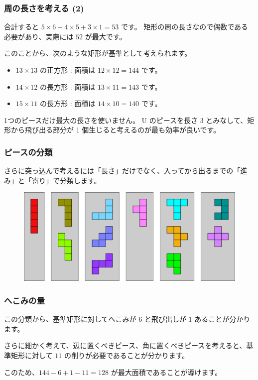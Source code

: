 \documentclass{beamer}
\begin{document}
\begin{frame}
    \frametitle{周の長さを考える (2)}

    合計すると \(5 \times 6 + 4 \times 5 + 3 \times 1 = 53\) です。
    矩形の周の長さなので偶数である必要があり、実際には \(52\) が最大です。

    \bigskip

    このことから、次のような矩形が基準として考えられます。

    \begin{itemize}
        \item \(13 \times 13\) の正方形 : 面積は \(12 \times 12 = 144\) です。
        \item \(14 \times 12\) の長方形 : 面積は \(13 \times 11 = 143\) です。
        \item \(15 \times 11\) の長方形 : 面積は \(14 \times 10 = 140\) です。
    \end{itemize}

    \bigskip

    1つのピースだけ最大の長さを使いません。
    U のピースを長さ 3 とみなして、矩形から飛び出る部分が 1 個生じると考えるのが最も効率が良いです。
\end{frame}

\begin{frame}
    \frametitle{ピースの分類}

    さらに突っ込んで考えるには「長さ」だけでなく、入ってから出るまでの「進み」と「寄り」で分類します。

    \begin{figure}
        \includegraphics[scale=0.2]{images/PentominoFarmClass.png}
    \end{figure}
\end{frame}

\begin{frame}
    \frametitle{へこみの量}

    この分類から、基準矩形に対してへこみが \(6\) と飛び出しが \(1\) あることが分かります。

    \bigskip

    さらに細かく考えて、辺に置くべきピース、角に置くべきピースを考えると、基準矩形に対して \(11\) の削りが必要であることが分かります。

    \bigskip

    このため、\(144 - 6 + 1 - 11 = 128\) が最大面積であることが導けます。
\end{frame}
\end{document}
